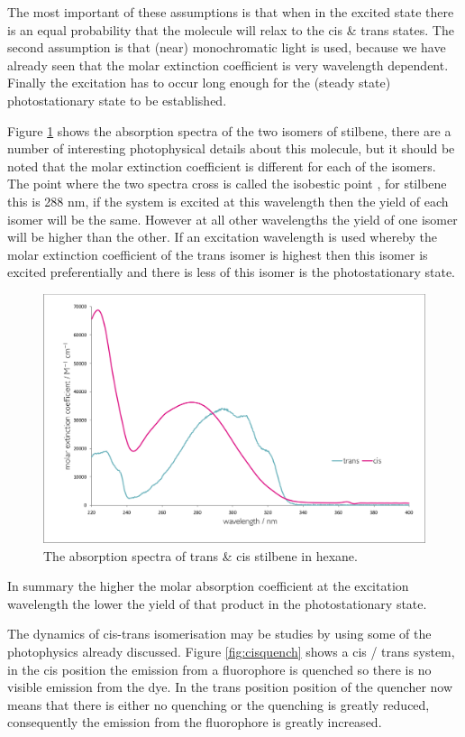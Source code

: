 \documentclass[
]{book}
\begin{document}
The most important of these assumptions is that when in the excited state there is an equal probability that the molecule will relax to the cis \& trans states. The second assumption is that (near) monochromatic light is used, because we have already seen that the molar extinction coefficient is very wavelength dependent. Finally the excitation has to occur long enough for the (steady state) photostationary state to be established.

Figure \ref{fig:cistransstilbene} shows the absorption spectra of the two isomers of stilbene, there are a number of interesting photophysical details about this molecule, but it should be noted that the molar extinction coefficient is different for each of the isomers. The point where the two spectra cross is called the isobestic point , for stilbene this is 288 nm, if the system is excited at this wavelength then the yield of each isomer will be the same. However at all other wavelengths the yield of one isomer will be higher than the other. If an excitation wavelength is used whereby the molar extinction coefficient of the trans isomer is highest then this isomer is excited preferentially and there is less of this isomer is the photostationary state.

\begin{figure}

{\centering \includegraphics[width=0.6\linewidth]{images/cistransstilbene} 

}

\caption{The absorption spectra of trans \& cis stilbene in hexane.}\label{fig:cistransstilbene}
\end{figure}

In summary the higher the molar absorption coefficient at the excitation wavelength the lower the yield of that product in the photostationary state.

The dynamics of cis-trans isomerisation may be studies by using some of the photophysics already discussed. Figure \ref{fig:cisquench} shows a cis / trans system, in the cis position the emission from a fluorophore is quenched so there is no visible emission from the dye. In the trans position position of the quencher now means that there is either no quenching or the quenching is greatly reduced, consequently the emission from the fluorophore is greatly increased.
\end{document}
